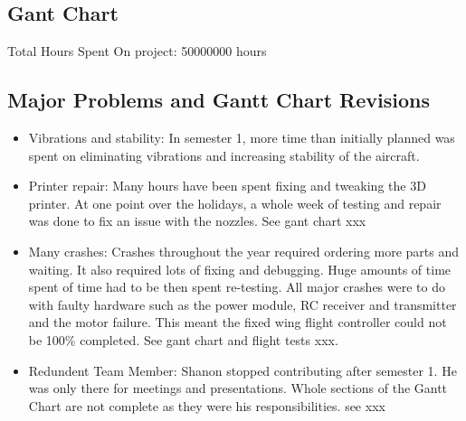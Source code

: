 \subsection{Gant Chart}

Total Hours Spent On project: 50000000 hours


\subsection{Major Problems and Gantt Chart Revisions}

\begin{itemize}
	\item Vibrations and stability: In semester 1, more time than initially planned was spent on eliminating vibrations and increasing stability of the aircraft. 
	\item Printer repair: Many hours have been spent fixing and tweaking the 3D printer.  At one point over the holidays, a whole week of testing and repair was done to fix an issue with the nozzles. See gant chart xxx
	\item Many crashes: Crashes throughout the year required ordering more parts and waiting. It also required lots of fixing and debugging. Huge amounts of time spent of time had to be then spent re-testing. All major crashes were to do with faulty hardware such as the power module, RC receiver and transmitter and the motor failure. This meant the fixed wing flight controller could not be 100\% completed. See gant chart and flight tests xxx.
	\item Redundent Team Member: Shanon stopped contributing after semester 1. He was only there for meetings and presentations. Whole sections of the Gantt Chart are not complete as they were his responsibilities. see xxx
\end{itemize}

